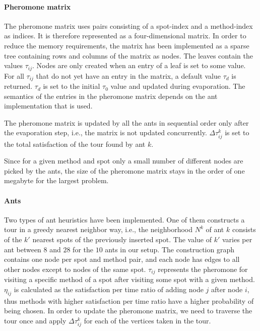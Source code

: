 \documentclass{article}
\begin{document}
\paragraph{Pheromone matrix}

The pheromone matrix uses pairs consisting of a spot-index and a method-index as indices. It is therefore represented as a four-dimensional
matrix. In order to reduce the memory requirements, the matrix has been implemented as a sparse tree containing rows and columns of the
matrix as nodes. The leaves contain the values $\tau_{ij}$. Nodes are only created when an entry of a leaf is set to some value. For all
$\tau_{ij}$ that do not yet have an entry in the matrix, a default value $\tau_d$ is returned. $\tau_d$ is set to the initial $\tau_0$ value 
and updated during evaporation. The semantics of the entries in the pheromone matrix depends on the ant implementation that is used.

The pheromone matrix is updated by all the ants in sequential order only after the evaporation step, i.e., the matrix is not updated
concurrently. $\Delta\tau_{ij}^k$ is set to the total satisfaction of the tour found by ant $k$. 

Since for a given method and spot only a small number of different nodes are picked by the ants, the size of the pheromone matrix stays in
the order of one megabyte for the largest problem.

\paragraph{Ants}

Two types of ant heuristics have been implemented. One of them constructs a tour in a greedy nearest neighbor way, i.e., the neighborhood
$N^k$ of ant $k$ consists of the $k'$ nearest spots of the previously inserted spot. The value of $k'$ varies per ant between $8$ and $28$
for the $10$ ants in our setup. The construction graph contains one node per spot and method pair, and each node has edges to all other
nodes except to nodes of the same spot. $\tau_{ij}$ represents the pheromone for visiting a specific method of a spot after visiting some
spot with a given method. $\eta_{ij}$ is calculated as the satisfaction per time ratio of adding node $j$ after node $i$, thus methods with
higher satisfaction per time ratio have a higher probability of being chosen.
In order to update the pheromone matrix, we need to traverse the tour once and apply $\Delta\tau_{ij}^k$ for each of the vertices taken in the tour.
\end{document}

